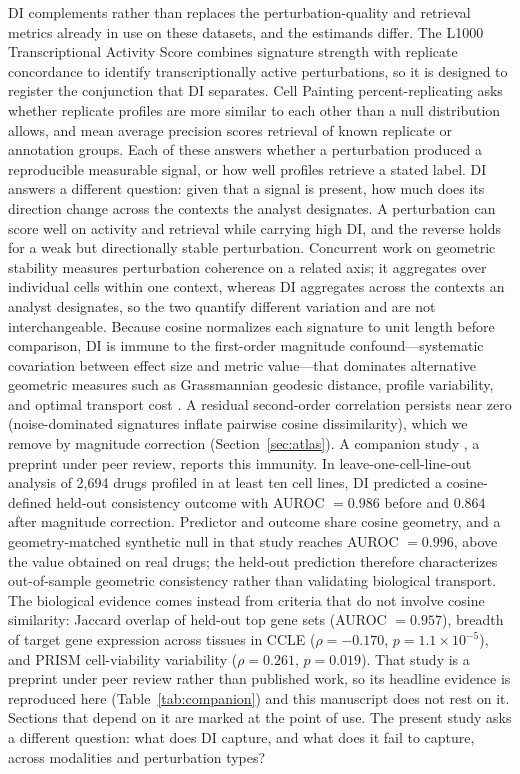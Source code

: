 \documentclass[11pt]{article}
\begin{document}
DI complements rather than replaces the perturbation-quality and retrieval
metrics already in use on these datasets, and the estimands differ.  The L1000
Transcriptional Activity Score combines signature strength with replicate
concordance to identify transcriptionally active perturbations, so it is
designed to register the conjunction that DI separates.  Cell Painting
percent-replicating asks whether replicate profiles are more similar to each
other than a null distribution allows, and mean average precision scores
retrieval of known replicate or annotation groups.  Each of these answers
whether a perturbation produced a reproducible measurable signal, or how well
profiles retrieve a stated label.  DI answers a different question: given that a
signal is present, how much does its direction change across the contexts the
analyst designates.  A perturbation can score well on activity and retrieval
while carrying high DI, and the reverse holds for a weak but directionally
stable perturbation.  Concurrent work on geometric stability
\citep{raju2026a, raju2026b} measures perturbation coherence on a related axis;
it aggregates over individual cells within one context, whereas DI aggregates
across the contexts an analyst designates, so the two quantify different
variation and are not interchangeable.  Because cosine normalizes each signature to unit
length before comparison, DI is immune to the first-order magnitude
confound---systematic covariation between effect size and metric
value---that dominates alternative geometric measures such as
Grassmannian geodesic distance, profile variability, and optimal
transport cost \citep{tower2026confound}.  A residual second-order
correlation persists near zero (noise-dominated signatures inflate
pairwise cosine dissimilarity), which we remove by magnitude correction
(Section~\ref{sec:atlas}).  A companion study \citep{tower2026confound}, a preprint under peer review,
reports this immunity.  In leave-one-cell-line-out analysis of 2{,}694 drugs
profiled in at least ten cell lines, DI predicted a cosine-defined held-out
consistency outcome with AUROC $= 0.986$ before and $0.864$ after magnitude
correction.  Predictor and outcome share cosine geometry, and a geometry-matched
synthetic null in that study reaches AUROC $= 0.996$, above the value obtained on
real drugs; the held-out prediction therefore characterizes out-of-sample
geometric consistency rather than validating biological transport.  The
biological evidence comes instead from criteria that do not involve cosine
similarity: Jaccard overlap of held-out top gene sets (AUROC $= 0.957$), breadth
of target gene expression across tissues in CCLE ($\rho = -0.170$,
$p = 1.1 \times 10^{-5}$), and PRISM cell-viability variability
($\rho = 0.261$, $p = 0.019$).  That study is a preprint under
peer review rather than published work, so its headline evidence is reproduced
here (Table~\ref{tab:companion}) and this manuscript does not rest on it.  Sections that depend on it are
marked at the point of use.  The present study asks a different question: what does DI capture, and what does it fail to capture, across
modalities and perturbation types?
\end{document}

